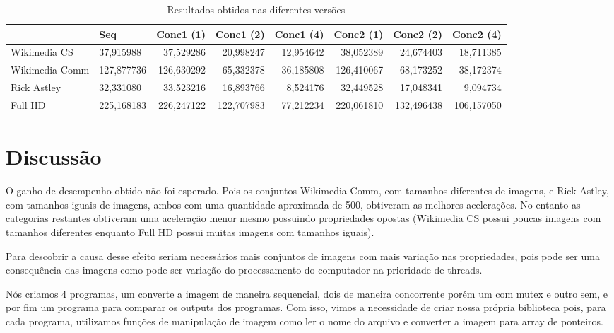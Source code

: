 \documentclass{article}
\begin{document}
\begin{table}[]
\begin{tabular}{|l|l|r|r|r|r|r|r|}
\hline
 &
  Seq &
  \multicolumn{1}{l|}{Conc1 (1)} &
  \multicolumn{1}{l|}{Conc1 (2)} &
  \multicolumn{1}{l|}{Conc1 (4)} &
  \multicolumn{1}{l|}{Conc2 (1)} &
  \multicolumn{1}{l|}{Conc2 (2)} &
  \multicolumn{1}{l|}{Conc2 (4)} \\ \hline
Wikimedia CS   & 37,915988  & 37,529286  & 20,998247  & 12,954642 & 38,052389  & 24,674403  & 18,711385  \\ \hline
Wikimedia Comm & 127,877736 & 126,630292 & 65,332378  & 36,185808 & 126,410067 & 68,173252  & 38,172374  \\ \hline
Rick Astley    & 32,331080  & 33,523216  & 16,893766  & 8,524176  & 32,449528  & 17,048341  & 9,094734   \\ \hline
Full HD        & 225,168183 & 226,247122 & 122,707983 & 77,212234 & 220,061810 & 132,496438 & 106,157050 \\ \hline
\end{tabular}
\caption{Resultados obtidos nas diferentes versões}
\label{tab:results}
\end{table}

\section{Discussão}
O ganho de desempenho obtido não foi esperado. Pois os conjuntos Wikimedia Comm, com tamanhos diferentes de imagens, e Rick Astley, com tamanhos iguais de imagens, ambos com uma quantidade aproximada de 500, obtiveram as melhores acelerações. No entanto as categorias restantes obtiveram uma aceleração menor mesmo possuindo propriedades opostas (Wikimedia CS possui poucas imagens com tamanhos diferentes enquanto Full HD possui muitas imagens com tamanhos iguais).

Para descobrir a causa desse efeito seriam necessários mais conjuntos de imagens com mais variação nas propriedades, pois pode ser uma consequência das imagens como pode ser variação do processamento do computador na prioridade de threads.

Nós criamos 4 programas, um converte a imagem de maneira sequencial, dois de maneira concorrente porém um com mutex e outro sem, e por fim um programa para comparar os outputs dos programas. Com isso, vimos a necessidade de criar nossa própria biblioteca pois, para cada programa, utilizamos funções de manipulação de imagem como ler o nome do arquivo e converter a imagem para array de ponteiros.
\end{document}
